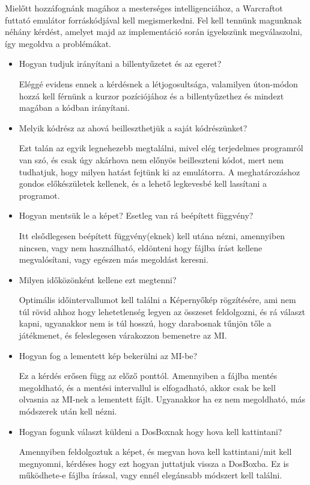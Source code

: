 Mielőtt hozzáfognánk magához a mesterséges intelligenciához, a Warcraftot futtató emulátor forráskódjával kell megismerkedni. Fel kell tennünk magunknak néhány kérdést, amelyet majd az implementáció során igyekszünk megválaszolni, így megoldva a problémákat.
\begin{itemize}
    \item Hogyan tudjuk irányítani a billentyűzetet és az egeret?
    
    Eléggé evidens ennek a kérdésnek a létjogosultsága, valamilyen úton-módon hozzá kell férnünk a kurzor pozíciójához és a billentyűzethez és mindezt magában a kódban irányítani.  
    \item Melyik kódrész az ahová beilleszthetjük a saját kódrészünket?
    
    Ezt talán az egyik legnehezebb megtalálni, mivel elég terjedelmes programról van szó, és csak úgy akárhova nem előnyös beilleszteni kódot, mert nem tudhatjuk, hogy milyen hatást fejtünk ki az emulátorra. A meghatározáshoz gondos előkészületek kellenek, és a lehető legkevesbé kell lassítani a programot.
\end{itemize}


\begin{itemize}
    \item Hogyan mentsük le a képet? Esetleg van rá beépített függvény?
    
    Itt elsődlegesen beépített függvény(eknek) kell utána nézni, amennyiben nincsen, vagy nem használható, eldönteni hogy fájlba írást kellene megvalósítani, vagy egészen más megoldást keresni.
    \item Milyen időközönként kellene ezt megtenni?
    
    Optimális időintervallumot kell találni a Képernyőkép rögzítésére, ami nem túl rövid ahhoz hogy lehetetlenség legyen az összeset feldolgozni, és rá választ kapni, ugyanakkor nem is túl hosszú, hogy darabosnak tűnjön tőle a játékmenet, és feleslegesen várakozzon bemenetre az MI.
\end{itemize}


\begin{itemize}
    \item Hogyan fog a lementett kép bekerülni az MI-be?
    
    Ez a kérdés erősen függ az előző ponttól. Amennyiben a fájlba mentés megoldható, és a mentési intervallul is elfogadható, akkor csak be kell olvasnia az MI-nek a lementett fájlt. Ugyanakkor ha ez nem megoldható, más módszerek után kell nézni.  
    
    \item Hogyan fogunk választ küldeni a DosBoxnak hogy hova kell kattintani?
    
    Amennyiben feldolgoztuk a képet, és megvan hova kell kattintani/mit kell megnyomni, kérdéses hogy ezt hogyan juttatjuk vissza a DosBoxba. Ez is működhete-e fájlba írással, vagy ennél elegánsabb módszert kell találni.  

\end{itemize}

